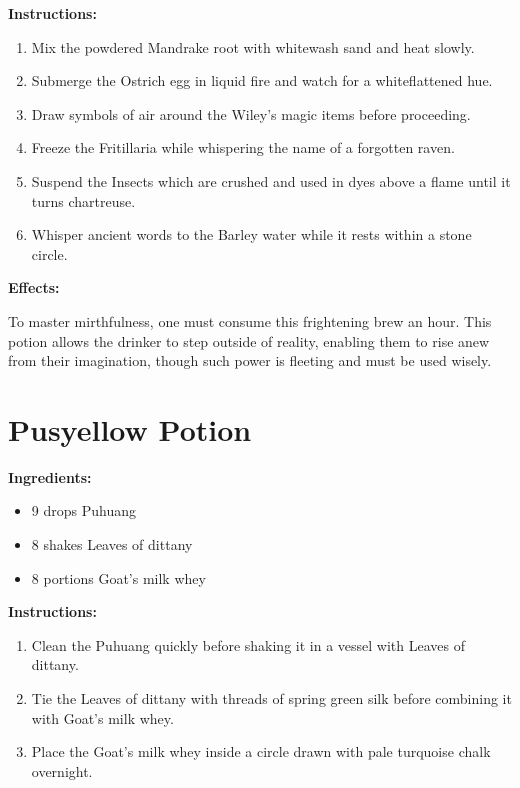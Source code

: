 \documentclass{article}
\begin{document}
\textbf{Instructions:}

\begin{enumerate}
  \item Mix the powdered Mandrake root with whitewash sand and heat slowly.
  \item Submerge the Ostrich egg in liquid fire and watch for a whiteflattened hue.
  \item Draw symbols of air around the Wiley's magic items before proceeding.
  \item Freeze the Fritillaria while whispering the name of a forgotten raven.
  \item Suspend the Insects which are crushed and used in dyes above a flame until it turns chartreuse.
  \item Whisper ancient words to the Barley water while it rests within a stone circle.
\end{enumerate}

\textbf{Effects:}

To master mirthfulness, one must consume this frightening brew an hour. This potion allows the drinker to step outside of reality, enabling them to rise anew from their imagination, though such power is fleeting and must be used wisely.

\newpage
\section*{Pusyellow Potion}

\textbf{Ingredients:}

\begin{itemize}
  \item 9 drops Puhuang
  \item 8 shakes Leaves of dittany
  \item 8 portions Goat's milk whey
\end{itemize}

\textbf{Instructions:}

\begin{enumerate}
  \item Clean the Puhuang quickly before shaking it in a vessel with Leaves of dittany.
  \item Tie the Leaves of dittany with threads of spring green silk before combining it with Goat's milk whey.
  \item Place the Goat's milk whey inside a circle drawn with pale turquoise chalk overnight.
\end{enumerate}
\end{document}
